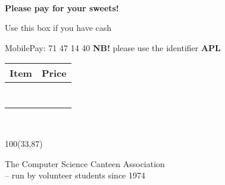 \documentclass{article}
\begin{document}
~\vspace{1cm}

\Large

\begin{center}

\fontsize{20}{20}\selectfont

\textbf{Please pay for your sweets!}

\end{center}



\large

\begin{minipage}{0.5\textwidth}

\begin{center}

Use this box if you have cash

\vspace{0.7cm}

MobilePay: 71 47 14 40 \textbf{NB!} please use the identifier \textbf{APL}

\end{center}

\end{minipage}
\begin{minipage}{0.5\textwidth}

\begin{center}

\begin{tabular}{|p{2.2cm}|p{2.2cm}|}
\hline
\textbf{Item} & \textbf{Price} \\\hline
&\\\hline
&\\\hline
&\\\hline
&\\\hline
&\\\hline
&\\\hline
&\\\hline
\end{tabular}

\end{center}

\end{minipage}

\normalsize

\vspace{\fill}

~

\begin{textblock}{100}(33,87)

\begin{flushright}
The Computer Science Canteen Association\\
-- run by volunteer students since 1974
\end{flushright}

\end{textblock}
\end{document}
